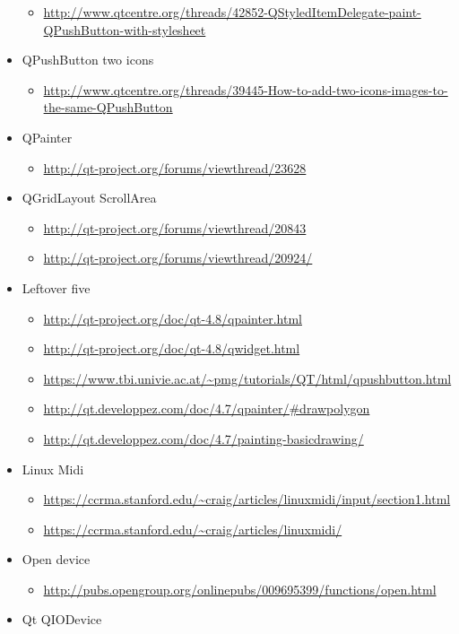 \documentclass[9pt,b5paper]{article}
\begin{document}
\begin{itemize}
\begin{itemize}
\item \url{http://www.qtcentre.org/threads/42852-QStyledItemDelegate-paint-QPushButton-with-stylesheet}
\end{itemize}
\item QPushButton two icons
\begin{itemize}
\item \url{http://www.qtcentre.org/threads/39445-How-to-add-two-icons-images-to-the-same-QPushButton}
\end{itemize}
\item QPainter
\begin{itemize}
\item \url{http://qt-project.org/forums/viewthread/23628}
\end{itemize}
\item QGridLayout ScrollArea
\begin{itemize}
\item \url{http://qt-project.org/forums/viewthread/20843}
\item \url{http://qt-project.org/forums/viewthread/20924/}
\end{itemize}
\item Leftover five
\begin{itemize}
\item \url{http://qt-project.org/doc/qt-4.8/qpainter.html}
\item \url{http://qt-project.org/doc/qt-4.8/qwidget.html}
\item \url{https://www.tbi.univie.ac.at/~pmg/tutorials/QT/html/qpushbutton.html}
\item \url{http://qt.developpez.com/doc/4.7/qpainter/#drawpolygon}
\item \url{http://qt.developpez.com/doc/4.7/painting-basicdrawing/}
\end{itemize}
\item Linux Midi
\begin{itemize}
\item \url{https://ccrma.stanford.edu/~craig/articles/linuxmidi/input/section1.html}
\item \url{https://ccrma.stanford.edu/~craig/articles/linuxmidi/}
\end{itemize}
\item Open device
\begin{itemize}
\item \url{http://pubs.opengroup.org/onlinepubs/009695399/functions/open.html}
\end{itemize}
\item Qt QIODevice

\end{itemize}
\end{document}

